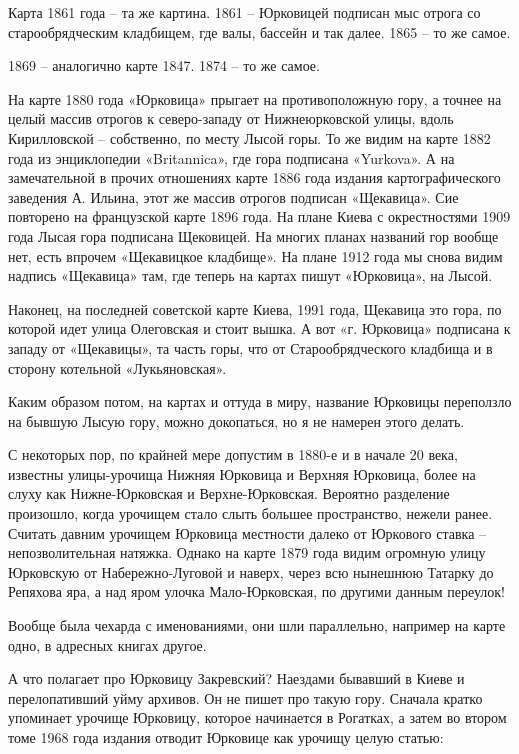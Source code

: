Карта 1861 года – та же картина. 1861 – Юрковицей подписан мыс отрога со старообрядческим кладбищем, где валы, бассейн и так далее. 1865 – то же самое.

1869 – аналогично карте 1847. 1874 – то же самое.

На карте 1880 года «Юрковица» прыгает на противоположную гору, а точнее на целый массив отрогов к северо-западу от Нижнеюрковской улицы, вдоль Кирилловской – собственно, по месту Лысой горы. То же видим на карте 1882 года из энциклопедии «Britannica», где гора подписана «Yurkova». А на замечательной в прочих отношениях карте 1886 года издания картографического заведения А. Ильина, этот же массив отрогов подписан «Щекавица». Сие повторено на французской карте 1896 года. На плане Киева с окрестностями 1909 года Лысая гора подписана Щековицей. На многих планах названий гор вообще нет, есть впрочем «Щекавицкое кладбище». На плане 1912 года мы снова видим надпись «Щекавица» там, где теперь на картах пишут «Юрковица», на Лысой.

Наконец, на последней советской карте Киева, 1991 года, Щекавица это гора, по которой идет улица Олеговская и стоит вышка. А вот «г. Юрковица» подписана к западу от «Щекавицы», та часть горы, что от Старообрядческого кладбища и в сторону котельной «Лукьяновская».

Каким образом потом, на картах и оттуда в миру, название Юрковицы переползло на бывшую Лысую гору, можно докопаться, но я не намерен этого делать.

С некоторых пор, по крайней мере допустим в 1880-е и в начале 20 века, известны улицы-урочища Нижняя Юрковица и Верхняя Юрковица, более на слуху как Нижне-Юрковская и Верхне-Юрковская. Вероятно разделение произошло, когда урочищем стало слыть большее пространство, нежели ранее. Считать давним урочищем Юрковица местности далеко от Юркового ставка – непозволительная натяжка. Однако на карте 1879 года видим огромную улицу Юрковскую от Набережно-Луговой и наверх, через всю нынешнюю Татарку до Репяхова яра, а над яром улочка Мало-Юрковская, по другими данным переулок! 

Вообще была чехарда с именованиями, они шли параллельно, например на карте одно, в адресных книгах другое.

А что полагает про Юрковицу Закревский? Наездами бывавший в Киеве и перелопативший уйму архивов. Он не пишет про такую гору.  Сначала кратко упоминает урочище Юрковицу, которое начинается в Рогатках, а затем во втором томе 1968 года издания отводит Юрковице как урочищу целую статью:

